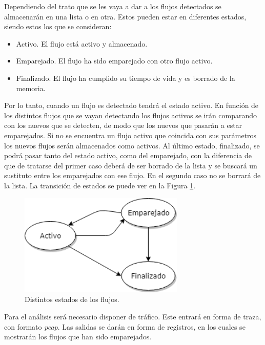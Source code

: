 \intro Dependiendo del trato que se les vaya a dar a los flujos detectados se almacenarán en una lista o en otra. Estos pueden estar 
en diferentes estados, siendo estos los que se consideran:

\begin{itemize}
\item Activo. El flujo está activo y almacenado.
\item Emparejado. El flujo ha sido emparejado con otro flujo activo.
\item Finalizado. El flujo ha cumplido su tiempo de vida y es borrado de la memoria.
\end{itemize}

\intro Por lo tanto, cuando un flujo es detectado tendrá el estado activo. En función 
de los distintos flujos que se vayan detectando los flujos activos se irán comparando con los nuevos que se detecten, de modo que los 
nuevos que pasarán a estar emparejados. Si no se encuentra un flujo activo que coincida con sus parámetros los nuevos flujos serán 
almacenados como activos. Al último estado, finalizado, se podrá pasar tanto del estado activo, como del emparejado, con la diferencia 
de que de tratarse del primer caso deberá de ser borrado de la lista y se buscará un sustituto entre los emparejados con ese flujo. En 
el segundo caso no se borrará de la lista. La transición de estados se puede ver en la Figura \ref{fig.flujos}.

\begin{figure}[H]
  \includegraphics[width=0.7\textwidth]{imagenes/flujos.png}
  \centering
  \caption{Distintos estados de los flujos.}\label{fig.flujos}
\end{figure}

\intro Para el análisis será necesario disponer de tráfico. Este entrará en forma de traza, con formato \textit{pcap}. Las salidas 
se darán en forma de registros, en los cuales se mostrarán los flujos que han sido emparejados.

